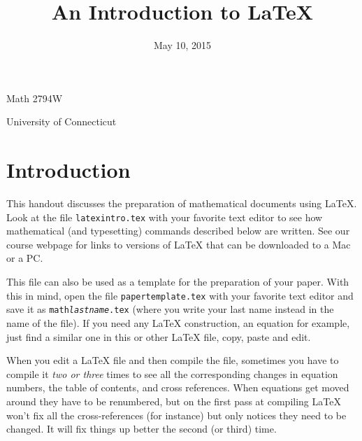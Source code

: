 \documentclass[12pt,letterpaper]{amsart}
\theoremstyle{plain}
\theoremstyle{definition}
\numberwithin{equation}{section}
\begin{document}
\begin{titlepage}
\title{An Introduction to LaTeX}
\author{}
\date{May 10, 2015}
\maketitle

\centerline{\Large Math 2794W}

\hfill

\centerline{\Large University of Connecticut}
\thispagestyle{empty}
\end{titlepage}
\pagebreak



\thispagestyle{empty}
\tableofcontents


\vfill



\pagebreak
 


\section{Introduction}\label{intro}

This handout discusses the preparation of 
mathematical documents using LaTeX.  
Look at the file {\tt latexintro.tex} with your 
favorite text editor to see how mathematical (and typesetting) commands 
described below are written.  See our course webpage for links to versions of LaTeX that can be downloaded to a Mac or a PC. 


This file can also be used as a template for the preparation of your paper. 
With this in mind, open the file {\tt papertemplate.tex} with your 
favorite text editor  and save it as 
{\tt math{\it lastname}.tex} (where you write your last name instead in 
the name of the file). 
If you need any LaTeX construction, an equation for example, 
just find a similar one in this or other LaTeX file, copy, paste and edit. 


When you edit a LaTeX file and then compile the file, 
sometimes you have to compile it {\it two or three} times to see 
all the corresponding changes in equation numbers, the table of contents, and
cross references.  When equations get moved around they have to be renumbered, 
but on the first 
pass at compiling LaTeX won't fix all the cross-references (for instance) but only notices 
they need to be changed.  It will fix things up better the second (or third) 
time.
\end{document}
